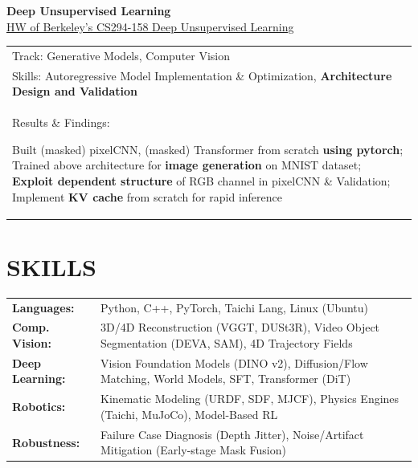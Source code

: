 \documentclass[a4paper,9pt]{extarticle}
\begin{document}
    \textbf{\Large Deep Unsupervised Learning} \\
    \href{https://github.com/JacobGIT2/deepul.git}{HW of Berkeley's CS294-158 Deep Unsupervised Learning}\\
    \vspace{2pt}
    \noindent
    \begin{tabular}{@{$\circ$\hspace{0.5em}} l}
        Track: Generative Models, Computer Vision \\
        Skills: Autoregressive Model Implementation \& Optimization, \textbf{Architecture Design and Validation}\\
        Results \& Findings:
        \parbox[t]{0.8\textwidth}
        {Built (masked) pixelCNN, (masked) Transformer from scratch \textbf{using pytorch};
        Trained above architecture for \textbf{image generation} on MNIST dataset;
        \textbf{Exploit dependent structure} of RGB channel in pixelCNN \& Validation;
        Implement \textbf{KV cache} from scratch for rapid inference}
    \end{tabular}
\section*{SKILLS}
\begin{tabularx}{\textwidth}{@{$\circ$\hspace{0.5em}} >{\bfseries}l X}
    Languages: & Python, C++, PyTorch, Taichi Lang, Linux (Ubuntu) \\
    Comp. Vision: & 3D/4D Reconstruction (VGGT, DUSt3R), Video Object Segmentation (DEVA, SAM), 4D Trajectory Fields \\
    Deep Learning: & Vision Foundation Models (DINO v2), Diffusion/Flow Matching, World Models, SFT, Transformer (DiT) \\
    Robotics: & Kinematic Modeling (URDF, SDF, MJCF), Physics Engines (Taichi, MuJoCo), Model-Based RL \\
    Robustness: & Failure Case Diagnosis (Depth Jitter), Noise/Artifact Mitigation (Early-stage Mask Fusion)
\end{tabularx}
\end{document}
